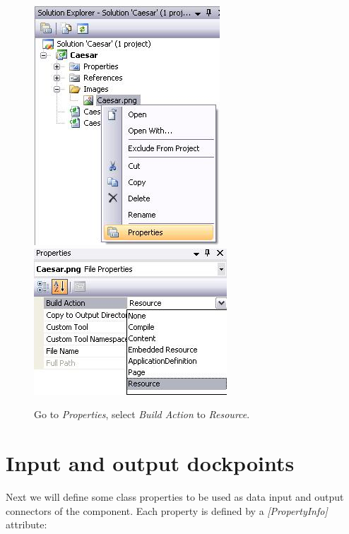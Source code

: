\begin{figure}[h!]
	\centering
		\includegraphics{figures/icon_properties.jpg} \includegraphics{figures/icon_build_action.jpg}
	\caption{Go to \textit{Properties}, select \textit{Build Action} to \textit{Resource}.}
	\label{fig:icon_properties}
\end{figure}

\section{Input and output dockpoints}
\label{sec:InputAndOutputDockpoints}

Next we will define some class properties to be used as data input and output connectors of the component. Each property is defined by a \textit{[PropertyInfo]} attribute:

